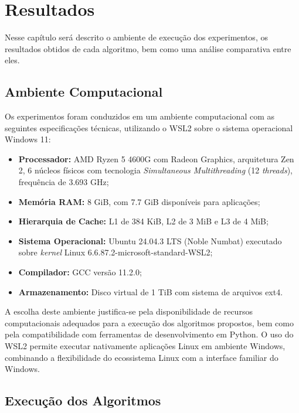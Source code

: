 \chapter{Resultados}
\label{chap:resultados}

Nesse capítulo será descrito o ambiente de execução dos experimentos, os resultados obtidos 
de cada algoritmo, bem como uma análise comparativa entre eles.

\section{Ambiente Computacional}

Os experimentos foram conduzidos em um ambiente computacional com as seguintes especificações 
técnicas, utilizando o \gls{WSL2} sobre o sistema operacional 
Windows 11:

\begin{itemize}
    \item \textbf{Processador:} AMD Ryzen 5 4600G com Radeon Graphics, arquitetura Zen 2, 6 núcleos 
    físicos com tecnologia \textit{Simultaneous Multithreading} (12 \textit{threads}), frequência 
    de 3.693 GHz;
    \item \textbf{Memória RAM:} 8 GiB, com 7.7 GiB disponíveis para aplicações;
    \item \textbf{Hierarquia de Cache:} L1 de 384 KiB, L2 de 3 MiB e L3 de 4 MiB;
    \item \textbf{Sistema Operacional:} Ubuntu 24.04.3 LTS (Noble Numbat) executado sobre 
    \textit{kernel} Linux 6.6.87.2-microsoft-standard-WSL2;
    \item \textbf{Compilador:} GCC versão 11.2.0;
    \item \textbf{Armazenamento:} Disco virtual de 1 TiB com sistema de arquivos ext4.
\end{itemize}

A escolha deste ambiente justifica-se pela disponibilidade de recursos computacionais adequados 
para a execução dos algoritmos propostos, bem como pela compatibilidade com ferramentas de 
desenvolvimento em Python. O uso do \gls{WSL2} permite executar nativamente aplicações Linux em ambiente 
Windows, combinando a flexibilidade do ecossistema Linux com a interface familiar do Windows.



\section{Execução dos Algoritmos}

